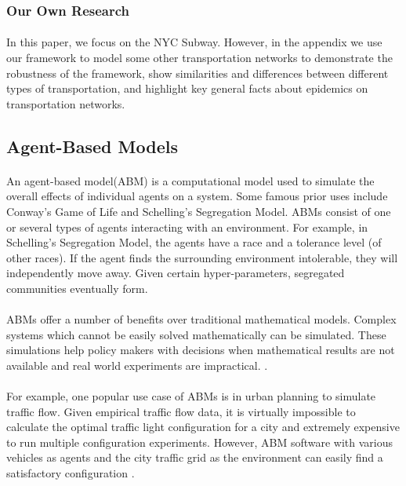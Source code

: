 \documentclass[12pt, a4, epsf] {article}
\theoremstyle{plain}
\theoremstyle{definition}
\begin{document}
\subsubsection{Our Own Research}
\paragraph{}
In this paper, we focus on the NYC Subway. However, in the appendix we use our framework to model some other transportation networks to demonstrate the robustness of the framework, show similarities and differences between different types of transportation, and highlight key general facts about epidemics on transportation networks.
\subsection{Agent-Based Models}
\paragraph{}
An agent-based model(ABM) is a computational model used to simulate the overall effects of individual agents on a system. Some famous prior uses include Conway's Game of Life and Schelling's Segregation Model\cite{schelling_1971}. ABMs consist of one or several types of agents interacting with an environment. For example, in Schelling's Segregation Model, the agents have a race and a tolerance level (of other races). If the agent finds the surrounding environment intolerable, they will independently move away. Given certain hyper-parameters, segregated communities eventually form.
\paragraph{}
ABMs offer a number of benefits over traditional mathematical models. Complex systems which cannot be easily solved mathematically can be simulated. These simulations help policy makers with decisions when mathematical results are not available and real world experiments are impractical. \cite{medicine_geller_ogawa_wallace_2015}.
\paragraph{}
For example, one popular use case of ABMs is in urban planning to simulate traffic flow. Given empirical traffic flow data, it is virtually impossible to calculate the optimal traffic light configuration for a city and extremely expensive to run multiple configuration experiments. However, ABM software with various vehicles as agents and the city traffic grid as the environment can easily find a satisfactory configuration \cite{traffic_book_2014}.
\end{document}
